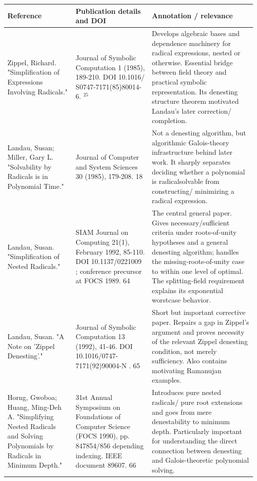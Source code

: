 \documentclass[10pt]{article}
\begin{document}
\begin{center}
\begin{tabular}[t]{|l|l|l|}
\hline
Reference & Publication details and DOI & Annotation / relevance \\
\hline
Zippel, Richard. "Simplification of Expressions Involving Radicals." & Journal of Symbolic Computation 1 (1985), 189-210. DOI 10.1016/ S0747-7171(85)80014-6. ${ }^{25}$ & Develops algebraic bases and dependence machinery for radical expressions, nested or otherwise. Essential bridge between field theory and practical symbolic representation. Its denesting structure theorem motivated Landau's later correction/ completion. \\
\hline
Landau, Susan; Miller, Gary L. "Solvability by Radicals is in Polynomial Time." & Journal of Computer and System Sciences 30 (1985), 179-208. 18 & Not a denesting algorithm, but algorithmic Galois-theory infrastructure behind later work. It sharply separates deciding whether a polynomial is radicalsolvable from constructing/ minimizing a radical expression. \\
\hline
Landau, Susan. "Simplification of Nested Radicals." & SIAM Journal on Computing 21(1), February 1992, 85-110. DOI 10.1137/0221009 ; conference precursor at FOCS 1989. 64 & The central general paper. Gives necessary/sufficient criteria under roots-of-unity hypotheses and a general denesting algorithm; handles the missing-roots-of-unity case to within one level of optimal. The splitting-field requirement explains its exponential worstcase behavior. \\
\hline
Landau, Susan. "A Note on 'Zippel Denesting'." & Journal of Symbolic Computation 13 (1992), 41-46. DOI 10.1016/0747-7171(92)90004-N . 65 & Short but important corrective paper. Repairs a gap in Zippel's argument and proves necessity of the relevant Zippel denesting condition, not merely sufficiency. Also contains motivating Ramanujan examples. \\
\hline
Horng, Gwoboa; Huang, Ming-Deh A. "Simplifying Nested Radicals and Solving Polynomials by Radicals in Minimum Depth." & 31st Annual Symposium on Foundations of Computer Science (FOCS 1990), pp. 847854/856 depending indexing. IEEE document 89607. 66 & Introduces pure nested radicals/ pure root extensions and goes from mere denestability to minimum depth. Particularly important for understanding the direct connection between denesting and Galois-theoretic polynomial solving. \\
\hline
\end{tabular}
\end{center}
\end{document}
